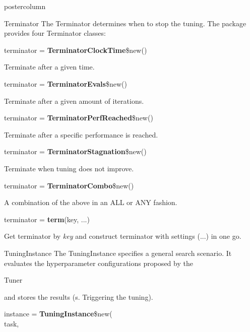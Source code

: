 \documentclass{beamer}
\newlength{\columnheight} %
\newcommand{\codeinline}[1]{\begin{codeboxinline}#1\end{codeboxinline}}
\begin{document}
\begin{frame}[fragile]{}
\begin{columns}
\begin{column}{.245\textwidth}
\begin{beamercolorbox}[center]{postercolumn}
				\begin{minipage}{.98\textwidth}
					\parbox[t][\columnheight]{\textwidth}{
						\begin{myblock}{Terminator}
						The Terminator determines when to stop the tuning. The package provides four Terminator classes:
						\\
						\begin{codebox}
							terminator = \textbf{TerminatorClockTime}\$new()
						\end{codebox}
						Terminate after a given time.
						\\
						\begin{codebox}
							terminator = \textbf{TerminatorEvals}\$new()
						\end{codebox}
						Terminate after a given amount of iterations. 
						\\
						\begin{codebox}
							terminator = \textbf{TerminatorPerfReached}\$new()
						\end{codebox}
						Terminate after a specific performance is reached.  
						\\
						\begin{codebox}
							terminator = \textbf{TerminatorStagnation}\$new()
						\end{codebox}
						Terminate when tuning does not improve.
						\\
						\begin{codebox}
							terminator = \textbf{TerminatorCombo}\$new()
						\end{codebox}
						A combination of the above in an ALL or ANY fashion.
						\\
						\begin{codebox}
							terminator = \textbf{term}(key, ...)
						\end{codebox}
						Get terminator by \textit{key} and construct terminator with settings (...) in one go. 
					\end{myblock}	
				\begin{myblock}{TuningInstance}
					The TuningInstance specifies a general search scenario. It evaluates the hyperparameter configurations proposed by the \codeinline{Tuner} and stores the results (s. Triggering the tuning).
					\\
					\begin{codeboxmultiline}[width=18cm]
						instance = \textbf{TuningInstance}\$new(\\
						\hspace*{1ex}task,\\

\end{codeboxmultiline}
\end{myblock}}
\end{minipage}
\end{beamercolorbox}
\end{column}
\end{columns}
\end{frame}
\end{document}
